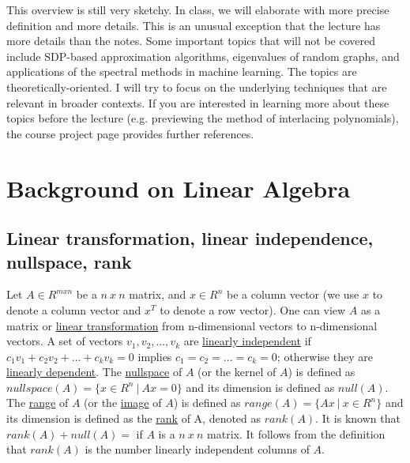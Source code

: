\documentclass[11pt,a4paper]{report}
\begin{document}
\newline\newline This overview is still very sketchy. In class, we will elaborate with more precise definition and more details. This is an unusual exception that the lecture has more details than the notes.
\newline\newline Some important topics that will not be covered include SDP-based approximation algorithms, eigenvalues of random graphs, and applications of the spectral methods in machine learning.
\newline\newline The topics are theoretically-oriented. I will try to focus on the underlying techniques that are relevant in broader contexts.
\newline\newline If you are interested in learning more about these topics before the lecture (e.g. previewing the method of interlacing polynomials), the course project page provides further references.

\section{Background on Linear Algebra}
\subsection{Linear transformation, linear independence, nullspace, rank}
Let $A\in R^{mxn}$ be a $n\ x \ n$ matrix, and $x\in R^{n}$ be a column vector (we use $x$ to denote a column vector and $x^T$ to denote a row vector).
\newline One can view $A$ as a matrix or \underline{linear transformation} from n-dimensional vectors to n-dimensional vectors.
\newline A set of vectors $v_1,v_2,...,v_k$ are \underline{linearly independent} if $c_1 v_1 + c_2 v_2 + ... + c_k v_k = 0$ implies $c_1=c_2=...=c_k=0$; otherwise they are \underline{linearly dependent}.
\newline The \underline{nullspace} of $A$ (or the kernel of $A$) is defined as $nullspace(A) = \{x\in R^n \ \vert \ Ax=0 \}$
and its dimension is defined as $null(A)$.
\newline The \underline{range} of $A$ (or the \underline{image} of $A$) is defined as $range(A) = \{Ax \ \vert \ x\in R^n\}$ and its dimension is defined as the \underline{rank} of A, denoted as $rank(A)$.
\newline It is known that $rank(A)+null(A)=$ if $A$ is a $n\ x \ n$ matrix.
\newline It follows from the definition that $rank(A)$ is the number linearly independent columns of $A$.
\end{document}
